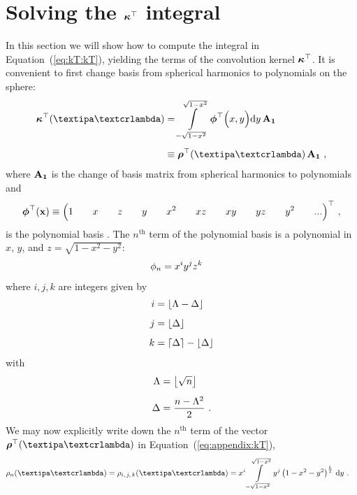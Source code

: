 \documentclass[modern]{aastex631}
\begin{document}
\section{Solving the $\kT$ integral}
\label{app:kT}
%
In this section we will show how to compute the integral in Equation~(\ref{eq:kT:kT}), yielding the terms of the convolution kernel $\kT$. 
It is convenient to first change basis from spherical harmonics to polynomials on the sphere:
%
\begin{align}
    \label{eq:appendix:kT}
    \kT(\lnlam)
     & =
    \int\limits_{-\sqrt{1 - x^2}}^
    {\sqrt{1 - x^2}}
    \pbasis
    \Big(x, y\Big)
    \mathrm{d}y
    \,
    \AOne
    \nonumber \\[0.5em]
     & \equiv
    \rhoT(\lnlam)
    \,
    \AOne
    \quad,
\end{align}
%
where $\AOne$ is the change of basis matrix from spherical harmonics to polynomials \citep[Equation B11 in][]{Luger2019} and
%
\begin{align}
    \pbasis(\x) \equiv
    \Big(
    1 \quad\quad\quad\quad\quad\quad x \quad\quad\quad\quad\quad\quad z \quad\quad\quad\quad\quad\quad y \quad\quad\quad\quad\quad\quad x^2 \quad\quad\quad\quad\quad\quad xz \quad\quad\quad\quad\quad\quad xy \quad\quad\quad\quad\quad\quad yz \quad\quad\quad\quad\quad\quad y^2 \quad\quad\quad\quad\quad\quad
    ...
    \Big)^\top
    \quad,
\end{align}
%
is the polynomial basis \citep[Equation 7][]{Luger2019}.
The $n^\mathrm{th}$ term of the polynomial basis is a polynomial in $x$, $y$, and $z = \sqrt{1 - x^2 - y^2}$:
%
\begin{align}
    \pbasisn
    &=
    x^i y^j z^k
\end{align}
%
where $i, j, k$ are integers given by
%
\begin{align}
    \label{eq:kT:lm}
    i &= \floor*{\Lambda - \Delta}
    \nonumber \\[0.5em]
    j &= \floor*{\Delta}
    \nonumber \\[0.5em]
    k &= \ceil*{\Delta} - \floor*{\Delta}
\end{align}
%
with
%
\begin{align}
    \Lambda &= \floor*{\sqrt{n}}
    \nonumber \\[0.5em]
    \Delta &= \frac{n - \Lambda^2}{2}
    \quad .
\end{align}
%
We may now explicitly write down the $n^\mathrm{th}$ term of the vector $\rhoT(\lnlam)$ in Equation~(\ref{eq:appendix:kT}),
%
\begin{align}
    \label{eq:kT:sTexpression}
    \rho_n(\lnlam)
     & =
    \rho_{i,\,j,\,k}(\lnlam)
    =
    x^i
    \int\limits_{-\sqrt{1 - x^2}}^
    {\sqrt{1 - x^2}}
    y^j
    \left(1 - x^2 - y^2\right)^{\frac{k}{2}} \,
    \mathrm{d}y
    \quad .
\end{align}
\end{document}
